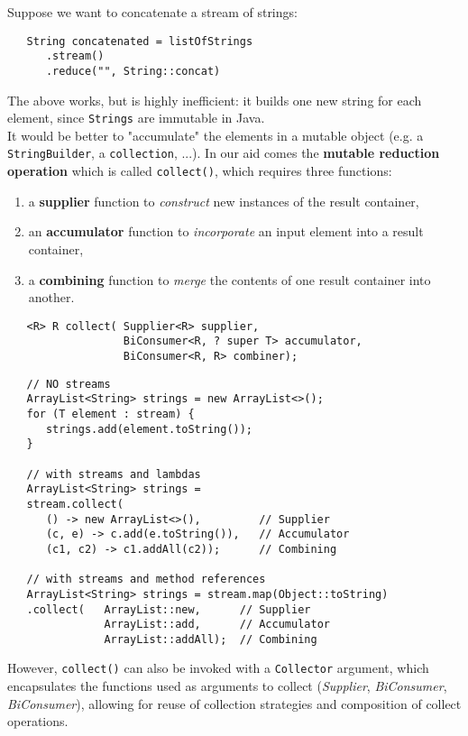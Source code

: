 Suppose we want to concatenate a stream of strings:
\begin{lstlisting}
   String concatenated = listOfStrings
      .stream()
      .reduce("", String::concat)
\end{lstlisting}
The above works, but is highly inefficient: it builds one new string for each element, since \lstinline|Strings| are immutable in Java.\\
It would be better to "accumulate" the elements in a mutable object (e.g. a \lstinline|StringBuilder|, a \lstinline|collection|, ...).
In our aid comes the \textbf{mutable reduction operation} which is called \lstinline|collect()|, which requires
three functions:
\begin{enumerate}
   \item a \textbf{supplier} function to \textit{construct} new instances of the result container,
   \item an \textbf{accumulator} function to \textit{incorporate} an input element into a result container,
   \item a \textbf{combining} function to \textit{merge} the contents of one result container into another.
\end{enumerate}
\begin{lstlisting}
   <R> R collect( Supplier<R> supplier,
                  BiConsumer<R, ? super T> accumulator,
                  BiConsumer<R, R> combiner);
\end{lstlisting}

\begin{lstlisting}
   // NO streams
   ArrayList<String> strings = new ArrayList<>();
   for (T element : stream) {
      strings.add(element.toString());
   }

   // with streams and lambdas
   ArrayList<String> strings =
   stream.collect(
      () -> new ArrayList<>(),         // Supplier
      (c, e) -> c.add(e.toString()),   // Accumulator
      (c1, c2) -> c1.addAll(c2));      // Combining
   
   // with streams and method references
   ArrayList<String> strings = stream.map(Object::toString)
   .collect(   ArrayList::new,      // Supplier
               ArrayList::add,      // Accumulator
               ArrayList::addAll);  // Combining
\end{lstlisting}

However, \lstinline|collect()| can also be invoked with a \lstinline|Collector| argument,
which encapsulates the functions used as
arguments to collect (\textit{Supplier}, \textit{BiConsumer},
\textit{BiConsumer}),
allowing for reuse of collection strategies and composition of collect operations.

